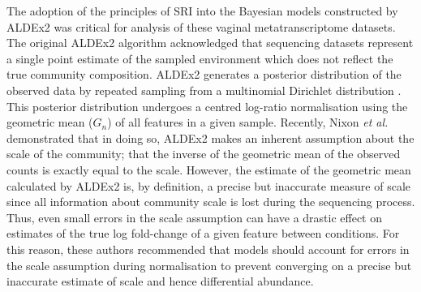 \documentclass[sn-mathphys,Numbered]{sn-jnl}%
\begin{document}
The adoption of the principles of SRI into the Bayesian models constructed by ALDEx2 was critical for analysis of these vaginal metatranscriptome datasets. The original ALDEx2 algorithm acknowledged that sequencing datasets represent a single point estimate of the sampled environment which does not reflect the true community composition. ALDEx2 generates a posterior distribution of the observed data by repeated sampling from a multinomial Dirichlet distribution \citep{fernandes:2013}. This posterior distribution undergoes a centred log-ratio normalisation using the geometric mean ($G_n$) of all features in a given sample. Recently, Nixon \textit{et al.} \citep{nixon2023scale} demonstrated that in doing so, ALDEx2 makes an inherent assumption about the scale of the community; that the inverse of the geometric mean of the observed counts is exactly equal to the scale. However, the estimate of the geometric mean calculated by ALDEx2 is, by definition, a precise but inaccurate measure of scale since all information about community scale is lost during the sequencing process. Thus, even small errors in the scale assumption can have a drastic effect on estimates of the true log fold-change of a given feature between conditions. For this reason, these authors recommended that models should account for errors in the scale assumption during normalisation to prevent converging on a precise but inaccurate estimate of scale and hence differential abundance. 

\end{document}
